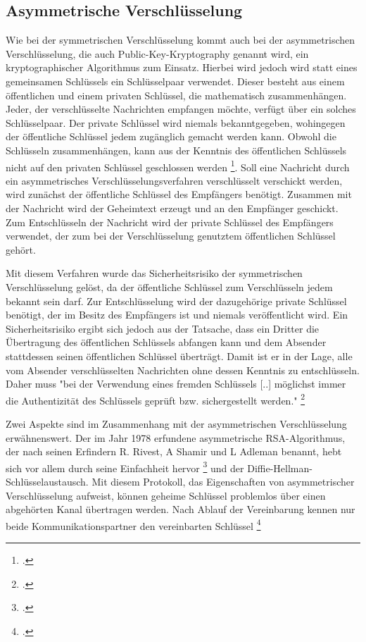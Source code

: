 \documentclass  [paper=a4,
				fontsize=12pt,
				listof=totoc,
				bibliography=totoc
				]{scrreprt}
\begin{document}
			\subsection{Asymmetrische Verschlüsselung}
				Wie bei der symmetrischen Verschlüsselung kommt auch bei der asymmetrischen Verschlüsselung, die auch Public-Key-Kryptography genannt wird, ein kryptographischer Algorithmus zum Einsatz. Hierbei wird jedoch wird statt eines gemeinsamen Schlüssels ein Schlüsselpaar verwendet. Dieser besteht aus einem öffentlichen und einem privaten Schlüssel, die mathematisch zusammenhängen. Jeder, der verschlüsselte Nachrichten empfangen möchte, verfügt über ein solches Schlüsselpaar. Der private Schlüssel wird niemals bekanntgegeben, wohingegen der öffentliche Schlüssel jedem zugänglich gemacht werden kann. Obwohl die Schlüsseln zusammenhängen, kann aus der Kenntnis des öffentlichen Schlüssels nicht auf den privaten Schlüssel geschlossen werden \footcite[S. 177]{Schmeh2013}.
				Soll eine Nachricht durch ein asymmetrisches Verschlüsselungsverfahren verschlüsselt verschickt werden, wird zunächst der öffentliche Schlüssel des Empfängers benötigt. Zusammen mit der Nachricht wird der Geheimtext erzeugt und an den Empfänger geschickt. Zum Entschlüsseln der Nachricht wird der private Schlüssel des Empfängers verwendet, der zum bei der Verschlüsselung genutztem öffentlichen Schlüssel gehört.
				
				Mit diesem Verfahren wurde das Sicherheitsrisiko der symmetrischen Verschlüsselung gelöst, da der öffentliche Schlüssel zum Verschlüsseln jedem bekannt sein darf. Zur Entschlüsselung wird der dazugehörige private Schlüssel benötigt, der im Besitz des Empfängers ist und niemals veröffentlicht wird.
				Ein Sicherheitsrisiko ergibt sich jedoch aus der Tatsache, dass ein Dritter die Übertragung des öffentlichen Schlüssels abfangen kann und dem Absender stattdessen seinen öffentlichen Schlüssel überträgt. Damit ist er in der Lage, alle vom Absender verschlüsselten Nachrichten ohne dessen Kenntnis zu entschlüsseln. Daher muss "bei der Verwendung eines fremden Schlüssels [..] möglichst immer die Authentizität des Schlüssels geprüft bzw. sichergestellt werden." \footcite[S. 90]{Ertel2012}
				
				Zwei Aspekte sind im Zusammenhang mit der asymmetrischen Verschlüsselung erwähnenswert. Der im Jahr 1978 erfundene asymmetrische RSA-Algorithmus, der nach seinen Erfindern R. Rivest, A Shamir und L Adleman benannt, hebt sich vor allem durch seine Einfachheit hervor \footcite[S. 79]{Ertel2012} und der Diffie-Hellman-Schlüsselaustausch. Mit diesem Protokoll, das Eigenschaften von asymmetrischer Verschlüsselung aufweist, können geheime Schlüssel problemlos über einen abgehörten Kanal übertragen werden. Nach Ablauf der Vereinbarung kennen nur beide Kommunikationspartner den vereinbarten Schlüssel \footcite[S. 129]{Stephan2011}
\end{document}
